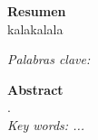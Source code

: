 \documentclass[12pt,letterpaper,oneside]{book}
\theoremstyle{plain}
\theoremstyle{definition}
\theoremstyle{remark}
\begin{document}
\newpage\null\thispagestyle{empty}\newpage

\newpage
\thispagestyle{empty}
\vspace*{3.5cm}

{\Large\textbf{Resumen}}\\

kalakalala

 
 

\textit{Palabras clave: }\\

\bigskip

{\Large\textbf{Abstract}}\\

.\\

\textit{Key words: ...}


\tableofcontents\thispagestyle{empty}
\pagestyle{plain}
\mainmatter
\pagestyle{fancy}
\fancyhf{}
\fancyhead[LO]{\leftmark}
\fancyhead[RO,LE]{\thepage}



\newpage

\newpage

\newpage

\newpage

\newpage

\newpage

\newpage\null\thispagestyle{empty}\newpage
%
\newpage


%
%












\end{document}
